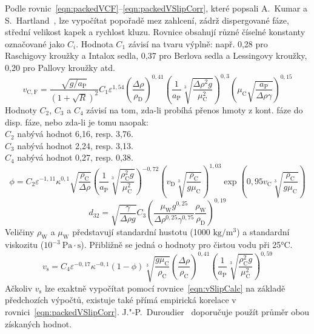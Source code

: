 Podle rovnic~\ref{eqn:packedVCF}--\ref{eqn:packedVSlipCorr}, které popsali A.~Kumar a S.~Hartland~\cite{Kumar1994}, lze vypočítat popořadě mez zahlcení, zádrž dispergované fáze, střední velikost kapek a rychlost kluzu.
Rovnice obsahují různé číselné konstanty označované jako $C_i$.
Hodnota $C_1$ závisí na tvaru výplně: např. 0,28 pro Raschigovy kroužky a Intalox sedla, 0,37 pro Berlova sedla a Lessingovy kroužky, 0,20 pro Pallovy kroužky atd.
\begin{equation}
\label{eqn:packedVCF}
	v_\mathrm{C,F} =
	\frac{ \sqrt{g/a_\mathrm{P}} }{ \left(1 + \sqrt{R} \right)^2 }
	C_1 \varepsilon^{1,54} \left( \frac{ \Delta\rho }{ \rho_\mathrm{D} } \right)^{0,41}
	\left( \frac{1}{a_\mathrm{P}} \sqrt[3]{\frac{\Delta\rho^2 g}{\mu_\mathrm{C}^2}} \right)^{0,3}
	\left( \mu_\mathrm{C} \sqrt{\frac{a_\mathrm{P}}{ \Delta\rho \gamma }} \right)^{0,15}
\end{equation}
Hodnoty $C_2$, $C_3$ a $C_4$ závisí na tom, zda-li probíhá přenos hmoty z kont. fáze do disp. fáze, nebo zda-li je tomu naopak:\\
\-\hspace{1cm} $C_2$ nabývá hodnot 6,16, resp. 3,76.\\
\-\hspace{1cm} $C_3$ nabývá hodnot 2,24, resp. 3,13.\\
\-\hspace{1cm} $C_4$ nabývá hodnot 0,27, resp. 0,38.
\begin{equation}
\label{eqn:packedPhi}
	\phi =
	C_2 \varepsilon^{-1,11} \kappa^{0,1}
	\sqrt{ \frac{ \rho_\mathrm{C} }{ \Delta\rho } }
	\left( \frac{1}{a_\mathrm{P}} \sqrt[3]{ \frac{ \rho_\mathrm{C}^2 g }{ \mu_\mathrm{C}^2 } } \right)^{-0,72}
	\left( v_\mathrm{D} \sqrt[3]{ \frac{ \rho_\mathrm{C} }{ g \mu_\mathrm{C}} } \right)^{1,03}
	\exp\left( 0,95 v_\mathrm{C} \sqrt[3]{ \frac{ \rho_\mathrm{C} }{ g \mu_\mathrm{C}} } \right)
\end{equation}
\begin{equation}
\label{eqn:packedD32}
	d_{32} =
	\sqrt{ \frac{ \gamma }{ \Delta\rho g } }
	C_3 \left( \frac{ \mu_\mathrm{W} g^{0,25} }{ \Delta\rho^{0,25} \gamma^{0,75} } \frac{ \rho_\mathrm{W} }{ \rho_\mathrm{D} } \right)^{0,19}
\end{equation}
Veličiny $\rho_\mathrm{W}$ a $\mu_\mathrm{W}$ představují standardní hustotu (1000 $\mathrm{kg / m^3}$) a standardní viskozitu ($10^{-3}~\mathrm{Pa \cdot s}$).
Přibližně se jedná o hodnoty pro čistou vodu při 25°C.
\begin{equation}
\label{eqn:packedVSlipCorr}
	v_\mathrm{s} = C_4 \varepsilon^{-0,17} \kappa^{-0,1} (1 - \phi)
	\sqrt[3]{ \frac{ g \mu_\mathrm{C} }{ \rho_\mathrm{C} } }
	\left( \frac{ \Delta\rho }{ \rho_\mathrm{C} } \right)^{0,41}
	\left( \frac{1}{ a_\mathrm{P} } \sqrt[3]{ \frac{ \rho_\mathrm{C}^2 g }{ \mu_\mathrm{C}^2 } } \right)^{0,59}
\end{equation}
Ačkoliv $v_\mathrm{s}$ lze exaktně vypočítat pomocí rovnice~\ref{eqn:vSlipCalc} na základě předchozích výpočtů, existuje také přímá empirická korelace v rovnici~\ref{eqn:packedVSlipCorr}.
J."-P.~Duroudier~\cite{Duroudier2016} doporučuje použít průměr obou získaných hodnot.

